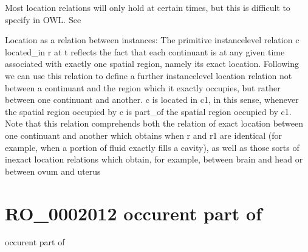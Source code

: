 \documentclass[letterpaper,10pt,english]{sphinxmanual}
\begin{document}
\begin{sphinxShadowBox}

\sphinxAtStartPar
Most location relations will only hold at certain times, but this is difficult to specify in OWL. See 

\sphinxAtStartPar
Location as a relation between instances: The primitive instance\sphinxhyphen{}level relation c located\_in r at t reflects the fact that each continuant is at any given time associated with exactly one spatial region, namely its exact location. Following we can use this relation to define a further instance\sphinxhyphen{}level location relation \sphinxhyphen{} not between a continuant and the region which it exactly occupies, but rather between one continuant and another. c is located in c1, in this sense, whenever the spatial region occupied by c is part\_of the spatial region occupied by c1.    Note that this relation comprehends both the relation of exact location between one continuant and another which obtains when r and r1 are identical (for example, when a portion of fluid exactly fills a cavity), as well as those sorts of inexact location relations which obtain, for example, between brain and head or between ovum and uterus
\end{sphinxShadowBox}

\begin{sphinxShadowBox}

\sphinxAtStartPar
{}
\end{sphinxShadowBox}
\begin{quote}
\label{\detokenize{doc-RO_0002012:ro-0002012}}\label{\detokenize{doc-RO_0002012:occurent-part-of}}\label{\detokenize{doc-RO_0002012:ro-0002012}}
\ignorespaces \end{quote}


\section{RO\_0002012 \sphinxhyphen{} occurent part of}
\label{\detokenize{doc-RO_0002012:ro-0002012-occurent-part-of}}\label{\detokenize{doc-RO_0002012:index-0}}\label{\detokenize{doc-RO_0002012::doc}}
\begin{sphinxShadowBox}

\sphinxAtStartPar
occurent part of
\end{sphinxShadowBox}
\end{document}
